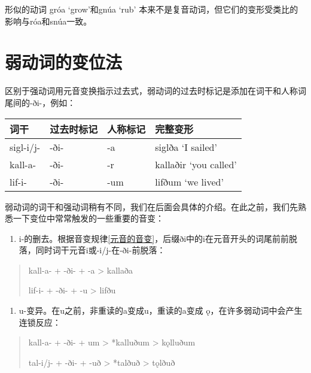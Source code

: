 形似的动词 gróa `grow‌'和gnúa `rub‌'
本来不是复音动词，但它们的变形受类比的影响与róa和snúa一致。

\section{弱动词的变位法}\label{弱动词的变位法}

区别于强动词用元音变换指示过去式，弱动词的过去时标记是添加在词干和人称词尾间的-ði-，例如：

\begin{longtable}{llll}
  \toprule
  词干      & 过去时标记 & 人称标记 & 完整变形              \\
  \midrule
  \endhead
  \bottomrule
  \endfoot
  sigl-i/j- & -ði-       & -a       & siglða `I sailed‌'     \\
  kall-a-   & -ði-       & -r       & kallaðir `you called‌' \\
  lif-i-    & -ði-       & -um      & lifðum `we lived‌'     \\
\end{longtable}

弱动词的词干和强动词稍有不同，我们在后面会具体的介绍。在此之前，我们先熟悉一下变位中常常触发的一些重要的音变：

\begin{enumerate}
  \def\labelenumi{\arabic{enumi})}
  \item
        i-的删去。根据音变规律\ref{元音的音变}，后缀ði中的i在元音开头的词尾前前脱落，同时词干元音i或-i/j-在-ði-前脱落：
\end{enumerate}

\begin{quote}
  kall-a- + -ði- + -a \textgreater{} kallaða

  lif-i- + -ði- + -u \textgreater{} lifðu
\end{quote}

\begin{enumerate}
  \def\labelenumi{\arabic{enumi})}
  \setcounter{enumi}{1}
  \item
        u-变异。在u之前，非重读的a变成u，重读的a变成
        ǫ，在许多弱动词中会产生连锁反应：
\end{enumerate}

\begin{quote}
  kall-a- + -ði- + um \textgreater{} *kalluðum \textgreater{} kǫlluðum

  tal-i/j- + -ði- + -uð \textgreater{} *talðuð \textgreater{} tǫlðuð
\end{quote}

